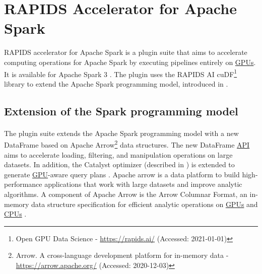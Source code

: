 \section{RAPIDS Accelerator for Apache Spark}
\label{sec:04_rapids}
RAPIDS accelerator for Apache Spark is a plugin suite that aims to accelerate computing operations for Apache Spark by executing pipelines entirely on \hyperlink{abbr:gpu}{GPUs}. It is available for Apache Spark 3 \cite{SparkRapids2020Docs}.
The plugin uses the RAPIDS AI cuDF\footnote{Open GPU Data Science - \url{https://rapids.ai/} (Accessed: 2021-01-01)} library to extend the Apache Spark programming model, introduced in  \cite{SparkRapids2020Docs, Mcdonald2020SparkRapids, Aguerzame2019GPUAO}.


\subsection{Extension of the Spark programming model}
\label{subsec:04_rapids_ext}
\paragraph{}The plugin suite extends the Apache Spark programming model with a new DataFrame based on Apache Arrow\footnote{Arrow. A cross-language development platform for in-memory data - \url{https://arrow.apache.org/} (Accessed: 2020-12-03)} data structures. The new DataFrame \hyperlink{abbr:api}{API} aims to accelerate loading, filtering, and manipulation operations on large datasets. In addition, the Catalyst optimizer (described in ) is extended to generate \hyperlink{abbr:gpu}{GPU}-aware query plans \cite{Mcdonald2020SparkRapids, Aguerzame2019GPUAO}.
Apache arrow is a data platform to build high-performance applications that work with large datasets and improve analytic algorithms. A component of Apache Arrow is the Arrow Columnar Format, an in-memory data structure specification for efficient analytic operations on \hyperlink{abbr:gpu}{GPUs} and \hyperlink{abbr:cpu}{CPUs} \cite{ApacheArrow2020Docs}.


